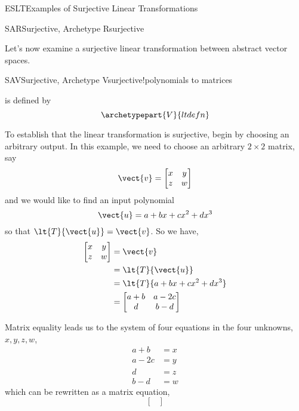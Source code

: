 \begin{subsect}{ESLT}{Examples of Surjective Linear Transformations}
\begin{example}{SAR}{Surjective, Archetype R}{surjective}
%
\end{example}
%
\begin{para}Let's now examine a surjective linear transformation between abstract vector spaces.\end{para}
%
\begin{example}{SAV}{Surjective, Archetype V}{surjective!polynomials to matrices}
\begin{para} is defined by
%
\begin{equation*}
\archetypepart{V}{ltdefn}\end{equation*}
\end{para}
%
\begin{para}To establish that the linear transformation is surjective, begin by choosing an arbitrary output.  In this example, we need to choose an arbitrary $2\times 2$ matrix, say
%
\begin{equation*}
\vect{v}=\begin{bmatrix}x&y\\z&w\end{bmatrix}
\end{equation*}
%
and we would like to find an input polynomial
%
\begin{equation*}
\vect{u}=a+bx+cx^2+dx^3
\end{equation*}
%
so that $\lt{T}{\vect{u}}=\vect{v}$.  So we have,
%
\begin{align*}
\begin{bmatrix}x&y\\z&w\end{bmatrix}&=\vect{v}\\
&=\lt{T}{\vect{u}}\\
&=\lt{T}{a+bx+cx^2+dx^3}\\
&=\begin{bmatrix}
a+b & a-2c\\
d & b-d
\end{bmatrix}
\end{align*}
\end{para}
%
\begin{para}Matrix equality leads us to the system of four equations in the four unknowns, $x,y,z,w$,
%
\begin{align*}
a+b&=x\\
a-2c&=y\\
d&=z\\
b-d&=w
\end{align*}
%
which can be rewritten as a matrix equation,
%
\begin{equation*}
\begin{bmatrix}

\end{bmatrix}
\end{equation*}
\end{para}
\end{example}
\end{subsect}

